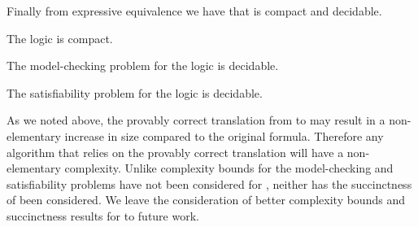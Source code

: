 Finally from expressive equivalence we have that \logicRmlS{} is compact and decidable.

\begin{corollary}
The logic \logicRmlS{} is compact.
\end{corollary}

\begin{corollary}
The model-checking problem for the logic \logicRmlS{} is decidable.
\end{corollary}

\begin{corollary}
The satisfiability problem for the logic \logicRmlS{} is decidable.
\end{corollary}

As we noted above, the provably correct translation from \langRml{} to \langMl{} may result in a non-elementary increase in size compared to the original formula.
Therefore any algorithm that relies on the provably correct translation will have a non-elementary complexity.
Unlike \logicRmlK{} complexity bounds for the model-checking and satisfiability problems have not been considered for \logicRmlS{}, neither has the succinctness of \logicRmlS{} been considered.
We leave the consideration of better complexity bounds and succinctness results for \logicRmlS{} to future work.
